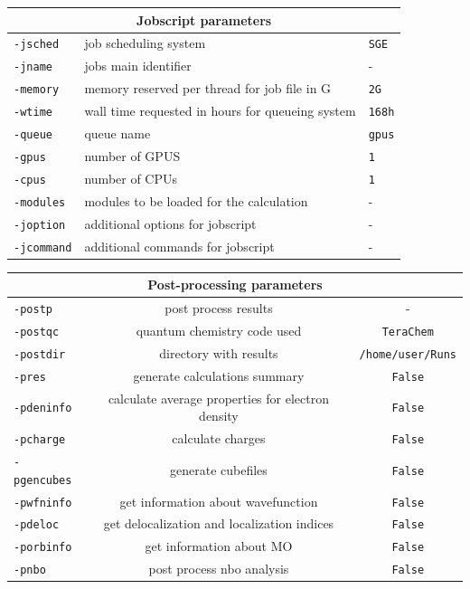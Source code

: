 \documentclass[a4paper,12pt]{assignment}
\begin{document}
\begin{tabular}{|l|l|l|}
\hline
\multicolumn{3}{|c|}{\Large \textbf{Jobscript parameters}}\\ \hline                        
\texttt{-jsched} & job scheduling system & \texttt{SGE} \\
\texttt{-jname} & jobs main identifier & - \\
\texttt{-memory} & memory reserved per thread for job file in G & \texttt{2G} \\
\texttt{-wtime} & wall time requested in hours for queueing system  & \texttt{168h} \\
\texttt{-queue} & queue name & \texttt{gpus} \\
\texttt{-gpus} & number of GPUS & \texttt{1} \\
\texttt{-cpus} & number of CPUs  & \texttt{1} \\
\texttt{-modules} &  modules to be loaded for the calculation & - \\
\texttt{-joption} & additional options for jobscript & - \\
\texttt{-jcommand} & additional commands for jobscript & - \\
\hline
\end{tabular}
\begin{tabular}{|l|c|c|}
\hline
\multicolumn{3}{|c|}{\Large\textbf{Post-processing parameters}}\\ \hline
\texttt{-postp} & post process results & - \\
\texttt{-postqc} & quantum chemistry code used & \texttt{TeraChem} \\
\texttt{-postdir} & directory with results & \texttt{/home/user/Runs} \\
\texttt{-pres} & generate calculations summary & \texttt{False} \\
\texttt{-pdeninfo} &  calculate average properties for electron density & \texttt{False} \\
\texttt{-pcharge} &   calculate charges & \texttt{False} \\
\texttt{-pgencubes} & generate cubefiles & \texttt{False} \\
\texttt{-pwfninfo} & get information about wavefunction & \texttt{False} \\
\texttt{-pdeloc} &     get delocalization and localization indices & \texttt{False} \\
\texttt{-porbinfo} & get information about MO & \texttt{False} \\
\texttt{-pnbo} & post process nbo analysis & \texttt{False} \\
\hline
\end{tabular}
\end{document}
